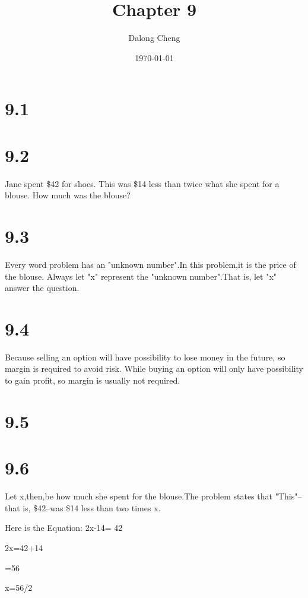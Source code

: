 \documentclass[12pt]{article}%
\begin{document}
\title{Chapter 9}
\author{Dalong Cheng}
\date{\today}
\maketitle
\section*{9.1}

\section*{9.2}
Jane spent \$42 for shoes. This was \$14 less than twice what she spent for a blouse. How much was the blouse?

\section*{9.3}
Every word problem has an "unknown number".In this problem,it is the price of the blouse. Always let "x" represent the "unknown number".That is, let "x" answer the question.

\section*{9.4}
Because selling an option will have possibility to lose money in the future, so margin is required to avoid risk. While buying an option will only have possibility to gain profit, so margin is usually not required.

\section*{9.5}

\section*{9.6}
Let x,then,be how much she spent for the blouse.The problem states that "This"--that is, \$42--was \$14 less than two times x.

           Here is the Equation: 2x-14= 42
                                 
                                 2x=42+14
                                 
                                 =56
                                 
                                 x=56/2
                                 
\end{document}
